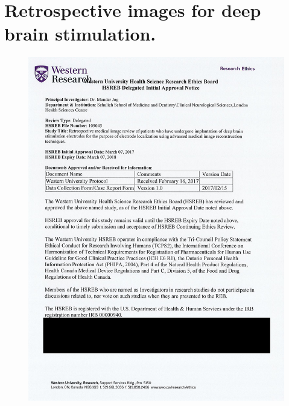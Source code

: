 \section{Retrospective images for deep brain stimulation.}\label{app:ethics2}
\begin{figure}[hbt!]
    \centering
    \includegraphics[width=0.9\linewidth]{figs/EthicsB.png}
    \label{fig:enter-label}
\end{figure}
